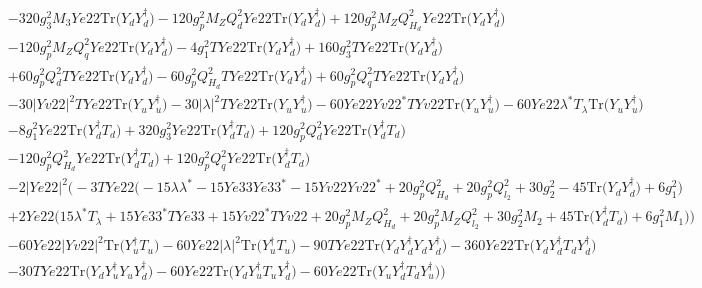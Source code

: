 \begin{align}
 &-320 g_{3}^{2} M_3 Ye22 \mbox{Tr}\Big({Y_d  Y_{d}^{\dagger}}\Big) -120 g_{p}^{2} M_Z Q_{d}^{2} Ye22 \mbox{Tr}\Big({Y_d  Y_{d}^{\dagger}}\Big) +120 g_{p}^{2} M_Z Q_{H_d}^{2} Ye22 \mbox{Tr}\Big({Y_d  Y_{d}^{\dagger}}\Big) \nonumber \\ 
 &-120 g_{p}^{2} M_Z Q_{q}^{2} Ye22 \mbox{Tr}\Big({Y_d  Y_{d}^{\dagger}}\Big) -4 g_{1}^{2} TYe22 \mbox{Tr}\Big({Y_d  Y_{d}^{\dagger}}\Big) +160 g_{3}^{2} TYe22 \mbox{Tr}\Big({Y_d  Y_{d}^{\dagger}}\Big) \nonumber \\ 
 &+60 g_{p}^{2} Q_{d}^{2} TYe22 \mbox{Tr}\Big({Y_d  Y_{d}^{\dagger}}\Big) -60 g_{p}^{2} Q_{H_d}^{2} TYe22 \mbox{Tr}\Big({Y_d  Y_{d}^{\dagger}}\Big) +60 g_{p}^{2} Q_{q}^{2} TYe22 \mbox{Tr}\Big({Y_d  Y_{d}^{\dagger}}\Big) \nonumber \\ 
 &-30 |Yv22|^2 TYe22 \mbox{Tr}\Big({Y_u  Y_{u}^{\dagger}}\Big) -30 |\lambda|^2 TYe22 \mbox{Tr}\Big({Y_u  Y_{u}^{\dagger}}\Big) -60 Ye22 Yv22^* TYv22 \mbox{Tr}\Big({Y_u  Y_{u}^{\dagger}}\Big) -60 Ye22 \lambda^* T_{\lambda} \mbox{Tr}\Big({Y_u  Y_{u}^{\dagger}}\Big) \nonumber \\ 
 &-8 g_{1}^{2} Ye22 \mbox{Tr}\Big({Y_{d}^{\dagger}  T_d}\Big) +320 g_{3}^{2} Ye22 \mbox{Tr}\Big({Y_{d}^{\dagger}  T_d}\Big) +120 g_{p}^{2} Q_{d}^{2} Ye22 \mbox{Tr}\Big({Y_{d}^{\dagger}  T_d}\Big) \nonumber \\ 
 &-120 g_{p}^{2} Q_{H_d}^{2} Ye22 \mbox{Tr}\Big({Y_{d}^{\dagger}  T_d}\Big) +120 g_{p}^{2} Q_{q}^{2} Ye22 \mbox{Tr}\Big({Y_{d}^{\dagger}  T_d}\Big) \nonumber \\ 
 &-2 |Ye22|^2 \Big(-3 TYe22 \Big(-15 \lambda \lambda^*  -15 Ye33 Ye33^*  -15 Yv22 Yv22^*  + 20 g_{p}^{2} Q_{H_d}^{2}  + 20 g_{p}^{2} Q_{l_2}^{2}  + 30 g_{2}^{2}  -45 \mbox{Tr}\Big({Y_d  Y_{d}^{\dagger}}\Big)  + 6 g_{1}^{2} \Big)\nonumber \\ 
 &+2 Ye22 \Big(15 \lambda^* T_{\lambda}  + 15 Ye33^* TYe33  + 15 Yv22^* TYv22  + 20 g_{p}^{2} M_Z Q_{H_d}^{2}  + 20 g_{p}^{2} M_Z Q_{l_2}^{2}  + 30 g_{2}^{2} M_2  + 45 \mbox{Tr}\Big({Y_{d}^{\dagger}  T_d}\Big)  + 6 g_{1}^{2} M_1 \Big)\Big)\nonumber \\ 
 &-60 Ye22 |Yv22|^2 \mbox{Tr}\Big({Y_{u}^{\dagger}  T_u}\Big) -60 Ye22 |\lambda|^2 \mbox{Tr}\Big({Y_{u}^{\dagger}  T_u}\Big) -90 TYe22 \mbox{Tr}\Big({Y_d  Y_{d}^{\dagger}  Y_d  Y_{d}^{\dagger}}\Big) -360 Ye22 \mbox{Tr}\Big({Y_d  Y_{d}^{\dagger}  T_d  Y_{d}^{\dagger}}\Big) \nonumber \\ 
 &-30 TYe22 \mbox{Tr}\Big({Y_d  Y_{u}^{\dagger}  Y_u  Y_{d}^{\dagger}}\Big) -60 Ye22 \mbox{Tr}\Big({Y_d  Y_{u}^{\dagger}  T_u  Y_{d}^{\dagger}}\Big) -60 Ye22 \mbox{Tr}\Big({Y_u  Y_{d}^{\dagger}  T_d  Y_{u}^{\dagger}}\Big) \Big)\\ 

\end{align}
